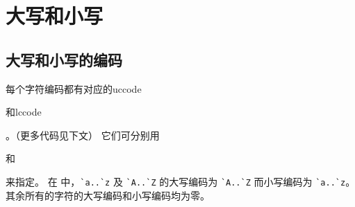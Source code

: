 \documentclass{book}
\begin{document}
\section{大写和小写}

\subsection{大写和小写的编码}
\label{uc/lc}

每个字符编码都有对应的\cstoidx uccode\par{}和\cstoidx lccode\par{}。（更多代码见下文）
它们可分别用
\begin{Disp}\end{Disp}
和
\begin{Disp}\end{Disp}
来指定。
在 \IniTeX 中，\verb-`a..`z- 及 \verb-`A..`Z- 的大写编码为%
\verb-`A..`Z- 而小写编码为 \verb-`a..`z-。%
其余所有的字符的大写编码和小写编码均为零。

\end{document}
